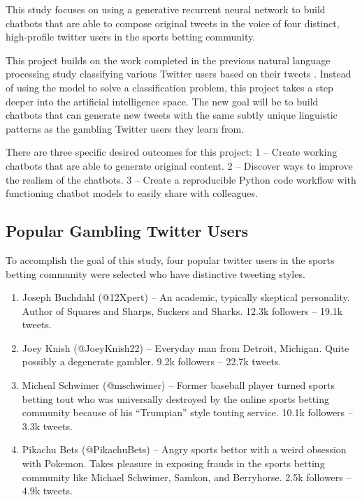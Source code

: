 \documentclass[5p,authoryear]{elsarticle}
\begin{document}
This study focuses on using a generative recurrent neural network to build chatbots that are able to compose original tweets in the voice of four distinct, high-profile twitter users in the sports betting community. 

This project builds on the work completed in the previous natural language processing study classifying various Twitter users based on their tweets \citep{lee}. Instead of using the model to solve a classification problem, this project takes a step deeper into the artificial intelligence space. The new goal will be to build chatbots that can generate new tweets with the same subtly unique linguistic patterns as the gambling Twitter users they learn from. 

There are three specific desired outcomes for this project: 1 – Create working chatbots that are able to generate original content. 2 – Discover ways to improve the realism of the chatbots. 3 – Create a reproducible Python code workflow with functioning chatbot models to easily share with colleagues. 



\subsection{Popular Gambling Twitter Users} \label{twitter}

To accomplish the goal of this study, four popular twitter users in the sports betting community were selected who have distinctive tweeting styles. 


\begin{enumerate}
 \item Joseph Buchdahl (@12Xpert) – An academic, typically skeptical personality. Author of Squares and Sharps, Suckers and Sharks. 12.3k followers – 19.1k tweets.
 \item Joey Knish (@JoeyKnish22) – Everyday man from Detroit, Michigan. Quite possibly a degenerate gambler. 9.2k followers – 22.7k tweets.
 \item Micheal Schwimer (@mschwimer) – Former baseball player turned sports betting tout who was universally destroyed by the online sports betting community because of his “Trumpian” style touting service. 10.1k followers – 3.3k tweets.
 \item Pikachu Bets (@PikachuBets) – Angry sports bettor with a weird obsession with Pokemon. Takes pleasure in exposing frauds in the sports betting community like Michael Schwimer, Samkon, and Berryhorse. 2.5k followers – 4.9k tweets.
\end{enumerate} \\
\end{document}
